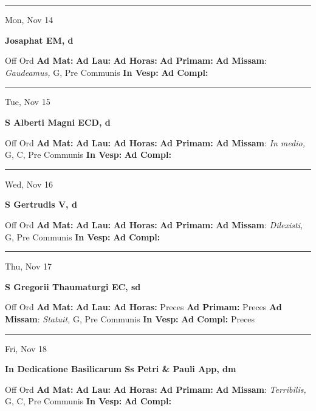 \documentclass[letterpaper, 10pt]{article}
\begin{document}
\hrule
\begin{center}
Mon, Nov 14
\end{center}\textbf{ \large Josaphat EM, \textnormal{\normalsize d}}
\begin{justify}
Off Ord
\textbf{Ad Mat: }
\textbf{Ad Lau: }
\textbf{Ad Horas: }
\textbf{Ad Primam: }
\textbf{Ad Missam}: \textit{Gaudeamus,} G, Pre Communis
\textbf{In Vesp: }
\textbf{Ad Compl: }\end{justify}



\hrule
\begin{center}
Tue, Nov 15
\end{center}\textbf{ \large S Alberti Magni ECD, \textnormal{\normalsize d}}
\begin{justify}
Off Ord
\textbf{Ad Mat: }
\textbf{Ad Lau: }
\textbf{Ad Horas: }
\textbf{Ad Primam: }
\textbf{Ad Missam}: \textit{In medio,} G, C, Pre Communis
\textbf{In Vesp: }
\textbf{Ad Compl: }\end{justify}



\hrule
\begin{center}
Wed, Nov 16
\end{center}\textbf{ \large S Gertrudis V, \textnormal{\normalsize d}}
\begin{justify}
Off Ord
\textbf{Ad Mat: }
\textbf{Ad Lau: }
\textbf{Ad Horas: }
\textbf{Ad Primam: }
\textbf{Ad Missam}: \textit{Dilexisti,} G, Pre Communis
\textbf{In Vesp: }
\textbf{Ad Compl: }\end{justify}



\hrule
\begin{center}
Thu, Nov 17
\end{center}\textbf{ \large S Gregorii Thaumaturgi EC, \textnormal{\normalsize sd}}
\begin{justify}
Off Ord
\textbf{Ad Mat: }
\textbf{Ad Lau: }
\textbf{Ad Horas: }Preces
\textbf{Ad Primam: }Preces
\textbf{Ad Missam}: \textit{Statuit,} G, Pre Communis
\textbf{In Vesp: }
\textbf{Ad Compl: }Preces\end{justify}



\hrule
\begin{center}
Fri, Nov 18
\end{center}\textbf{ \large In Dedicatione Basilicarum Ss Petri \& Pauli App, \textnormal{\normalsize dm}}
\begin{justify}
Off Ord
\textbf{Ad Mat: }
\textbf{Ad Lau: }
\textbf{Ad Horas: }
\textbf{Ad Primam: }
\textbf{Ad Missam}: \textit{Terribilis,} G, C, Pre Communis
\textbf{In Vesp: }
\textbf{Ad Compl: }\end{justify}
\end{document}
